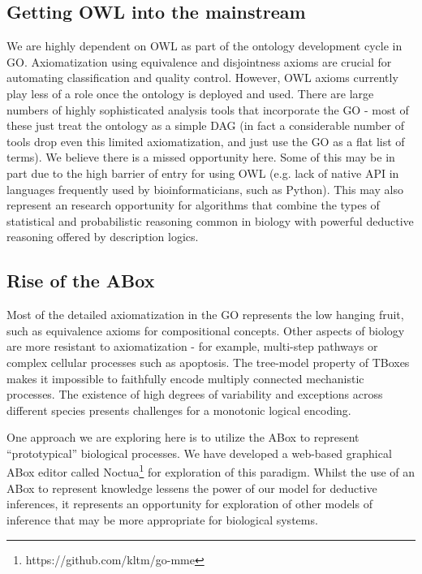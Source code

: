 \documentclass{llncs}
\begin{document}
\subsection{Getting OWL into the mainstream}

We are highly dependent on OWL as part of the ontology development
cycle in GO. Axiomatization using equivalence and disjointness
axioms are crucial for automating classification and quality
control. However, OWL axioms currently play less of a role once the ontology
is deployed and used. There are large numbers of highly sophisticated
analysis tools that incorporate the GO - most of these just treat the
ontology as a simple DAG (in fact a considerable number of tools drop
even this limited axiomatization, and just use the GO as a flat list
of terms). We believe there is a missed opportunity here. Some of this
may be in part due to the high barrier of entry for using OWL
(e.g. lack of native API in languages frequently used by
bioinformaticians, such as Python). This may also represent an
research opportunity for algorithms that combine the types of
statistical and probabilistic reasoning common in biology with
powerful deductive reasoning offered by description logics.

\subsection{Rise of the ABox}

Most of the detailed axiomatization in the GO represents the low
hanging fruit, such as equivalence axioms for compositional
concepts. Other aspects of biology are more resistant to
axiomatization - for example, multi-step pathways or complex cellular
processes such as apoptosis. The tree-model property of TBoxes makes
it impossible to faithfully encode multiply connected mechanistic
processes. The existence of high degrees of variability and exceptions
across different species presents challenges for a monotonic logical
encoding.

One approach we are exploring here is to utilize the ABox to represent
``prototypical'' biological processes. We have developed a web-based
graphical ABox editor called
Noctua\footnote{https://github.com/kltm/go-mme} for exploration of
this paradigm. Whilst the use of an ABox to represent knowledge
lessens the power of our model for deductive inferences, it represents
an opportunity for exploration of other models of inference that may
be more appropriate for biological systems.
\end{document}
